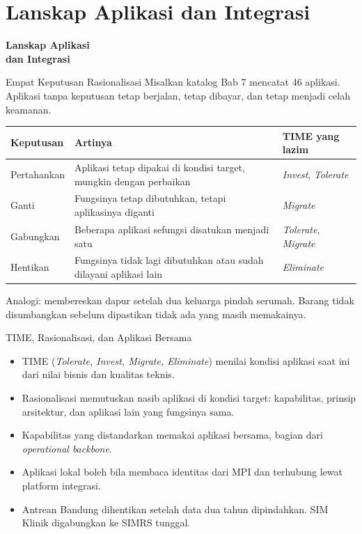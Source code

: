 \documentclass[aspectratio=169, table, 12pt]{beamer}
\begin{document}
\section{Lanskap Aplikasi dan Integrasi}

\begin{frame}{\hfill}
  \centering
  \Huge{\textbf{Lanskap Aplikasi\\dan Integrasi}}
\end{frame}

\begin{frame}{{\Large Empat Keputusan Rasionalisasi}}
  \small Misalkan katalog Bab 7 mencatat 46 aplikasi. Aplikasi tanpa keputusan tetap berjalan, tetap
  dibayar, dan tetap menjadi celah keamanan.

  \vspace{4pt}
  \footnotesize
  \begin{tabularx}{\textwidth}{L{2.1cm}YL{3.0cm}}
    \hline
    \textbf{Keputusan} & \textbf{Artinya} & \textbf{TIME yang lazim} \\
    \hline
    Pertahankan & Aplikasi tetap dipakai di kondisi target, mungkin dengan perbaikan & \textit{Invest}, \textit{Tolerate} \\
    \hline
    Ganti & Fungsinya tetap dibutuhkan, tetapi aplikasinya diganti & \textit{Migrate} \\
    \hline
    Gabungkan & Beberapa aplikasi sefungsi disatukan menjadi satu & \textit{Tolerate}, \textit{Migrate} \\
    \hline
    Hentikan & Fungsinya tidak lagi dibutuhkan atau sudah dilayani aplikasi lain & \textit{Eliminate} \\
    \hline
  \end{tabularx}

  \vspace{4pt}
  \small Analogi: membereskan dapur setelah dua keluarga pindah serumah. Barang tidak disumbangkan
  sebelum dipastikan tidak ada yang masih memakainya.
\end{frame}

\begin{frame}{{\Large TIME, Rasionalisasi, dan Aplikasi Bersama}}
  \small
  \vspace{6pt}
  \begin{itemize}
    \item TIME (\textit{Tolerate, Invest, Migrate, Eliminate}) menilai kondisi aplikasi saat ini dari
          nilai bisnis dan kualitas teknis.
    \item Rasionalisasi memutuskan nasib aplikasi di kondisi target: kapabilitas, prinsip arsitektur,
          dan aplikasi lain yang fungsinya sama.
    \item Kapabilitas yang distandarkan memakai aplikasi bersama, bagian dari \textit{operational
          backbone}.
    \item Aplikasi lokal boleh bila membaca identitas dari MPI dan terhubung lewat platform integrasi.
    \item Antrean Bandung dihentikan setelah data dua tahun dipindahkan. SIM Klinik digabungkan ke
          SIMRS tunggal.
  \end{itemize}
\end{frame}
\end{document}
